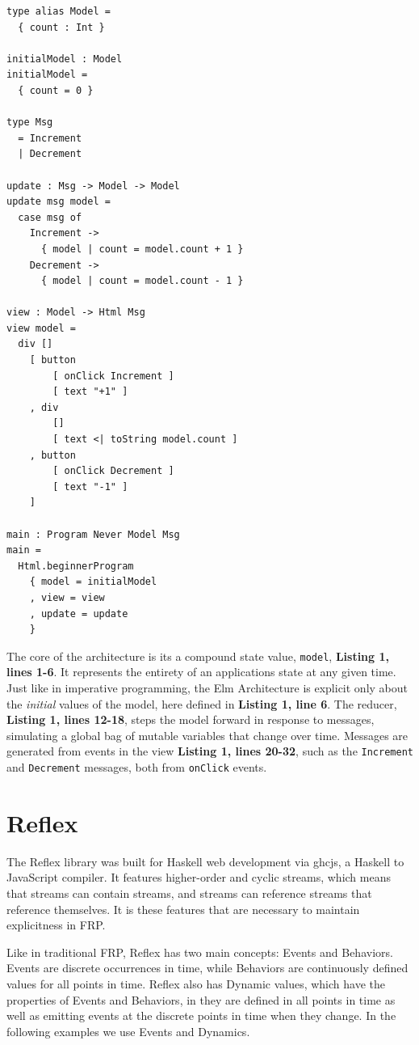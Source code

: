 \documentclass[sigconf]{acmart}
\begin{document}
\begin{lstlisting}[caption={Elm Counter}]
type alias Model =
  { count : Int }
  
initialModel : Model
initialModel =
  { count = 0 }
 
type Msg
  = Increment
  | Decrement

update : Msg -> Model -> Model
update msg model =
  case msg of
    Increment ->
      { model | count = model.count + 1 }
    Decrement ->
      { model | count = model.count - 1 }
      
view : Model -> Html Msg
view model =
  div []
    [ button 
        [ onClick Increment ] 
        [ text "+1" ]
    , div 
        [] 
        [ text <| toString model.count ]
    , button 
        [ onClick Decrement ] 
        [ text "-1" ]
    ]

main : Program Never Model Msg
main =
  Html.beginnerProgram
    { model = initialModel
    , view = view
    , update = update
    }
\end{lstlisting}

The core of the architecture is its a compound state value, \lstinline{model}, \textbf{Listing 1, lines 1-6}. It represents the entirety of an applications state at any given time. Just like in imperative programming, the Elm Architecture is explicit only about the \textit{initial} values of the model, here defined in \textbf{Listing 1, line 6}. The reducer, \textbf{Listing 1, lines 12-18}, steps the model forward in response to messages, simulating a global bag of mutable variables that change over time. Messages are generated from events in the view \textbf{Listing 1, lines 20-32}, such as the \lstinline{Increment} and \lstinline{Decrement} messages, both from \lstinline{onClick} events.

\section{Reflex}

The Reflex library was built for Haskell web development via ghcjs, a Haskell to JavaScript compiler. It features higher-order and cyclic streams, which means that streams can contain streams, and streams can reference streams that reference themselves. It is these features that are necessary to maintain explicitness in FRP.

Like in traditional FRP\cite{elliott1997functional}, Reflex has two main concepts: Events and Behaviors. Events are discrete occurrences in time, while Behaviors are continuously defined values for all points in time. Reflex also has Dynamic values, which have the properties of Events and Behaviors, in they are defined in all points in time as well as emitting events at the discrete points in time when they change. In the following examples we use Events and Dynamics.
\end{document}
